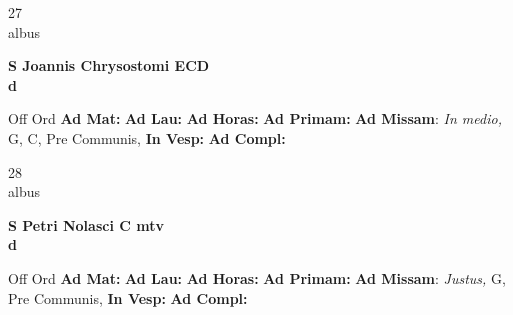 \documentclass[10pt, openany]{book}
\begin{document}
    \begin{center}
        \begin{minipage}{3.5in}
            \vspace{2em}
            \begin{minipage}{0.5in}
                {\Huge 27} \\
                {\normalsize albus}
            \end{minipage}
            \begin{minipage}{3.0in}
                \textbf{ \large S Joannis Chrysostomi ECD \\
                \textnormal{\normalsize d}}

            \end{minipage}
            \begin{justify}Off Ord
                \textbf{Ad Mat: }
                \textbf{Ad Lau: }
                \textbf{Ad Horas: }
                \textbf{Ad Primam: }\textbf{Ad Missam}: \textit{In medio,} G, C, Pre Communis, 
                \textbf{In Vesp: }
                \textbf{Ad Compl: }
            \end{justify}
        \end{minipage}
    \end{center}

    \begin{center}
        \begin{minipage}{3.5in}
            \vspace{2em}
            \begin{minipage}{0.5in}
                {\Huge 28} \\
                {\normalsize albus}
            \end{minipage}
            \begin{minipage}{3.0in}
                \textbf{ \large S Petri Nolasci C mtv \\
                \textnormal{\normalsize d}}

            \end{minipage}
            \begin{justify}Off Ord
                \textbf{Ad Mat: }
                \textbf{Ad Lau: }
                \textbf{Ad Horas: }
                \textbf{Ad Primam: }\textbf{Ad Missam}: \textit{Justus,} G, Pre Communis, 
                \textbf{In Vesp: }
                \textbf{Ad Compl: }
            \end{justify}
        \end{minipage}
    \end{center}
\end{document}
